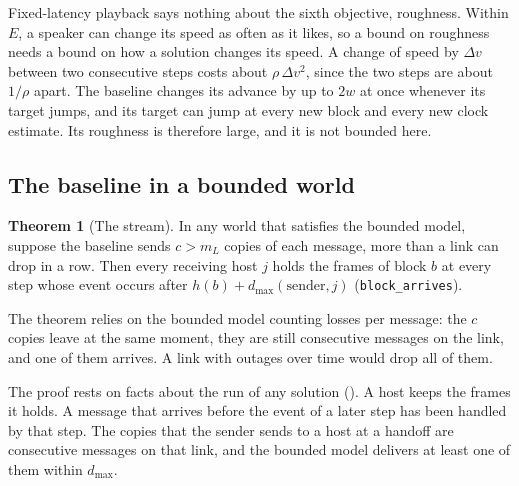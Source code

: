 \documentclass[11pt,a4paper]{article}
\newcommand{\lean}[1]{\texttt{#1}}
\theoremstyle{definition}
\newtheorem{theorem}[definition]{Theorem}
\begin{document}
Fixed-latency playback says nothing about the sixth objective, roughness.
Within $E$, a speaker can change its speed as often as it likes, so a bound
on roughness needs a bound on how a solution changes its speed. A change of
speed by $\Delta v$ between two consecutive steps costs about
$\rho\,\Delta v^2$, since the two steps are about $1/\rho$ apart. The
baseline changes its advance by up to $2w$ at once whenever its target
jumps, and its target can jump at every new block and every new clock
estimate. Its roughness is therefore large, and it is not bounded here.

\subsection{The baseline in a bounded world}

\begin{theorem}[The stream]\label{thm:stream}
In any world that satisfies the bounded model, suppose the baseline sends
$c > m_L$ copies of each message, more than a link can drop in a row. Then
every receiving host $j$ holds the frames of block $b$ at every step whose
event occurs after $h(b) + d_{\max}(\text{sender}, j)$
(\lean{block\_arrives}).
\end{theorem}

The theorem relies on the bounded model counting losses per message: the
$c$ copies leave at the same moment, they are still consecutive messages on
the link, and one of them arrives. A link with outages over time would drop
all of them.

The proof rests on facts about the run of any solution
(). A host keeps the frames it holds. A
message that arrives before the event of a later step has been handled by
that step. The copies that the sender sends to a host at a handoff are
consecutive messages on that link, and the bounded model delivers at least
one of them within $d_{\max}$.
\end{document}

